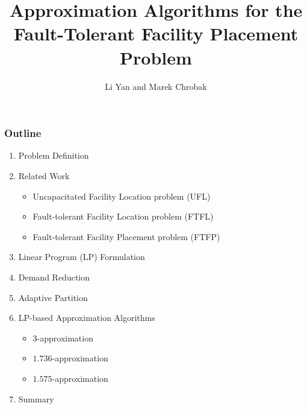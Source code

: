 \documentclass[handout, hyperref, dvipsnames]{beamer}
\title[FTFP]{Approximation Algorithms
  for the Fault-Tolerant Facility Placement Problem}
\author[lyan,marek]{Li Yan and Marek Chrobak}
\institute[UCR]{
  Computer Science\\
  University of California Riverside\\
}
\date{}
\begin{document}
\begin{frame}
  \titlepage
\end{frame}

\begin{frame}
  \frametitle{Outline}
  \begin{enumerate}

  \item Problem Definition

  \item Related Work
    \begin{itemize}
    \item Uncapacitated Facility Location problem (UFL)
    \item Fault-tolerant Facility Location problem (FTFL)
    \item Fault-tolerant Facility Placement problem (FTFP)
    \end{itemize}

  \item Linear Program (LP) Formulation

  \item Demand Reduction

  \item Adaptive Partition

  \item LP-based Approximation Algorithms
      \begin{itemize}
        \item $3$-approximation
        \item $1.736$-approximation
        \item $1.575$-approximation
        \end{itemize}

  \item{Summary}
  \end{enumerate}
\end{frame}
\end{document}
